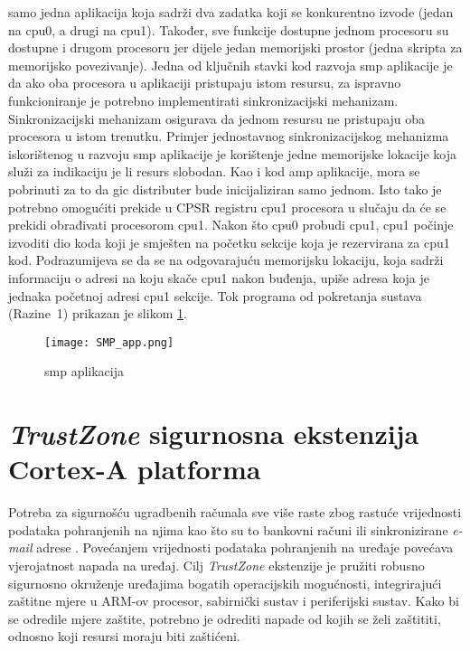 \documentclass[times, utf8, diplomski, numeric]{fer}
\begin{document}
samo jedna aplikacija koja sadrži dva zadatka koji se konkurentno izvode (jedan na \gls{cpu}0, a drugi na \gls{cpu}1). Također, sve
funkcije dostupne jednom procesoru su dostupne i drugom procesoru jer dijele jedan memorijski prostor (jedna skripta za
memorijsko povezivanje). Jedna od ključnih stavki kod razvoja \gls{smp} aplikacije je da ako oba procesora u aplikaciji pristupaju
istom resursu, za ispravno funkcioniranje je potrebno implementirati sinkronizacijski mehanizam. Sinkronizacijski mehanizam
osigurava da jednom resursu ne pristupaju oba procesora u istom trenutku. Primjer jednostavnog sinkronizacijskog mehanizma
iskorištenog u razvoju \gls{smp} aplikacije je korištenje jedne memorijske lokacije koja služi za indikaciju je li resurs slobodan.
Kao i kod \gls{amp} aplikacije, mora se pobrinuti za to da \gls{gic} distributer bude inicijaliziran samo jednom. Isto tako je potrebno
omogućiti prekide u CPSR registru \gls{cpu}1 procesora u slučaju da će se prekidi obrađivati procesorom \gls{cpu}1. Nakon što \gls{cpu}0
probudi \gls{cpu}1, \gls{cpu}1 počinje izvoditi dio koda koji je smješten na početku sekcije koja je rezervirana za \gls{cpu}1 kod.
Podrazumijeva se da se na odgovarajuću memorijsku lokaciju, koja sadrži informaciju o adresi na koju skače \gls{cpu}1 nakon buđenja,
upiše adresa koja je jednaka početnoj adresi \gls{cpu}1 sekcije. Tok programa od pokretanja sustava (Razine~1) prikazan je slikom
\ref{smp_app}.
\begin{figure}[H]
  \centering
	\texttt{[image: SMP\_app.png]}%
	\caption{\gls{smp} aplikacija}
	\label{smp_app}%
\end{figure}

\chapter{\textit{TrustZone} sigurnosna ekstenzija Cortex-A platforma}
Potreba za sigurnošću ugradbenih računala sve više raste zbog rastuće vrijednosti podataka pohranjenih na njima kao
što su to bankovni računi ili sinkronizirane \textit{e-mail} adrese \cite{tz_wp}. Povećanjem vrijednosti podataka pohranjenih na
uređaje povećava vjerojatnost napada na uređaj. Cilj \textit{TrustZone} ekstenzije je pružiti robusno sigurnosno okruženje
uređajima bogatih operacijskih mogućnosti, integrirajući zaštitne mjere u ARM-ov procesor, sabirnički sustav i periferijski
sustav. Kako bi se odredile mjere zaštite, potrebno je odrediti napade od kojih se želi zaštititi, odnosno koji resursi
moraju biti zaštićeni.
\end{document}
